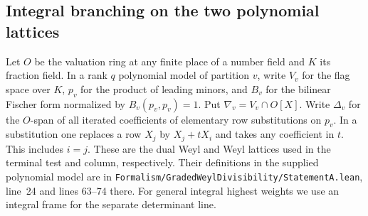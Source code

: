 \documentclass[a4paper,11pt]{article}
\theoremstyle{definition}
\theoremstyle{remark}
\newcommand{\srcloc}[2]{{\small\nolinkurl{#1.lean}}, line~#2}
\numberwithin{equation}{section}
\begin{document}
\subsection{Integral branching on the two polynomial lattices}\label{sec:weylrestriction351}

Let \(O\) be the valuation ring at any finite place of a number
field and \(K\) its fraction field. In a rank \(q\) polynomial
model of partition \(v\), write \(V_v\) for the flag space over
\(K\), \(p_v\) for the product of leading minors, and \(B_v\)
for the bilinear Fischer form normalized by \(B_v(p_v,p_v)=1\).
Put \(\nabla_v=V_v\cap O[X]\). Write \(\Delta_v\) for the
\(O\)-span of all iterated coefficients of elementary row
substitutions on \(p_v\). In a substitution one replaces a
row \(X_j\) by \(X_j+tX_i\) and takes any coefficient in \(t\).
This includes \(i=j\). These are the dual Weyl and Weyl lattices
used in the terminal test and column, respectively. Their
definitions in the supplied polynomial model are in
\srcloc{Formalism/GradedWeylDivisibility/StatementA}{24}
and lines 63--74 there. For general integral highest weights we
use an integral frame for the separate determinant line.
\end{document}
